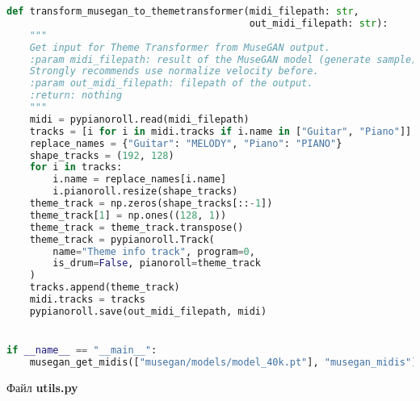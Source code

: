 \begin{lstlisting}[language=Python]
def transform_musegan_to_themetransformer(midi_filepath: str,
                                          out_midi_filepath: str):
    """
    Get input for Theme Transformer from MuseGAN output.
    :param midi_filepath: result of the MuseGAN model (generate sample).
    Strongly recommends use normalize velocity before.
    :param out_midi_filepath: filepath of the output.
    :return: nothing
    """
    midi = pypianoroll.read(midi_filepath)
    tracks = [i for i in midi.tracks if i.name in ["Guitar", "Piano"]]
    replace_names = {"Guitar": "MELODY", "Piano": "PIANO"}
    shape_tracks = (192, 128)
    for i in tracks:
        i.name = replace_names[i.name]
        i.pianoroll.resize(shape_tracks)
    theme_track = np.zeros(shape_tracks[::-1])
    theme_track[1] = np.ones((128, 1))
    theme_track = theme_track.transpose()
    theme_track = pypianoroll.Track(
        name="Theme info track", program=0,
        is_drum=False, pianoroll=theme_track
    )
    tracks.append(theme_track)
    midi.tracks = tracks
    pypianoroll.save(out_midi_filepath, midi)


if __name__ == "__main__":
    musegan_get_midis(["musegan/models/model_40k.pt"], "musegan_midis")

\end{lstlisting}

Файл \textbf{utils.py}

